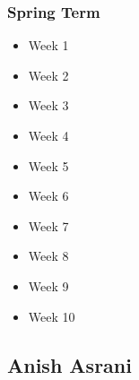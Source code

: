 	\subsubsection{Spring Term}
	\begin{itemize}
		\item{Week 1}
		\item{Week 2}
		\item{Week 3}
		\item{Week 4}
		\item{Week 5}
		\item{Week 6}
		\item{Week 7}
		\item{Week 8}
		\item{Week 9}
		\item{Week 10}
	\end{itemize}

	\pagebreak

	\subsection{Anish Asrani}
